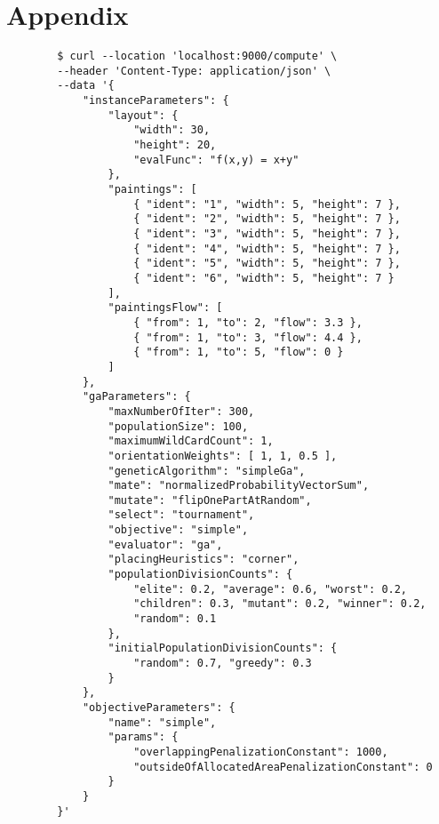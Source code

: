 \chapter{Appendix}\label{ch:appendix}


\begin{listing}[h!]
    \centering
    \begin{verbatim}
        $ curl --location 'localhost:9000/compute' \
        --header 'Content-Type: application/json' \
        --data '{
            "instanceParameters": {
                "layout": {
                    "width": 30,
                    "height": 20,
                    "evalFunc": "f(x,y) = x+y"
                },
                "paintings": [
                    { "ident": "1", "width": 5, "height": 7 },
                    { "ident": "2", "width": 5, "height": 7 },
                    { "ident": "3", "width": 5, "height": 7 },
                    { "ident": "4", "width": 5, "height": 7 },
                    { "ident": "5", "width": 5, "height": 7 },
                    { "ident": "6", "width": 5, "height": 7 }
                ],
                "paintingsFlow": [
                    { "from": 1, "to": 2, "flow": 3.3 },
                    { "from": 1, "to": 3, "flow": 4.4 },
                    { "from": 1, "to": 5, "flow": 0 }
                ]
            },
            "gaParameters": {
                "maxNumberOfIter": 300,
                "populationSize": 100,
                "maximumWildCardCount": 1,
                "orientationWeights": [ 1, 1, 0.5 ],
                "geneticAlgorithm": "simpleGa",
                "mate": "normalizedProbabilityVectorSum",
                "mutate": "flipOnePartAtRandom",
                "select": "tournament",
                "objective": "simple",
                "evaluator": "ga",
                "placingHeuristics": "corner",
                "populationDivisionCounts": {
                    "elite": 0.2, "average": 0.6, "worst": 0.2,
                    "children": 0.3, "mutant": 0.2, "winner": 0.2,
                    "random": 0.1
                },
                "initialPopulationDivisionCounts": {
                    "random": 0.7, "greedy": 0.3
                }
            },
            "objectiveParameters": {
                "name": "simple",
                "params": {
                    "overlappingPenalizationConstant": 1000,
                    "outsideOfAllocatedAreaPenalizationConstant": 0
                }
            }
        }'
    \end{verbatim}
    \cprotect\caption[Example of computation submission without instance]
    {Example of computation submission using \verb|curl|\footnote{\url{https://curl.se/}} without specifying the instance name.
    Without it, everything has to be entered manually into the request – layout width and height, paintings together with their flow, and evaluation function.
    }

    \label{lst:computation-submission-manual}
\end{listing}

